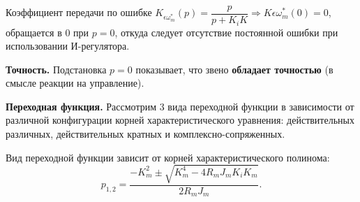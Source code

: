 \documentclass[12pt,a4paper]{extarticle}
\begin{document}
	Коэффициент передачи по ошибке $K_{\epsilon\omega_m^*}(p)=\dfrac{p}{p+K_iK}\Rightarrow{}K{\epsilon\omega_m^*}(0)=0$, обращается в 0 при $p = 0$, откуда следует отсутствие постоянной ошибки при использовании И-регулятора.	
	
	\textbf{Точность.} Подстановка $p=0$ показывает, что звено \textbf{обладает точностью} (в смысле реакции на управление).
	
	\textbf{Переходная функция.} Рассмотрим 3 вида переходной функции в зависимости от различной конфигурации корней характеристического уравнения: действительных различных, действительных кратных и комплексно-сопряженных.
	
	Вид переходной функции зависит от корней характеристического полинома:
	\begin{equation}
		p_{1,2}=\dfrac{-K_m^2\pm\sqrt{K^4_m-4R_mJ_mK_iK_m}}{2R_mJ_m}.
	\end{equation}
	
\end{document}
